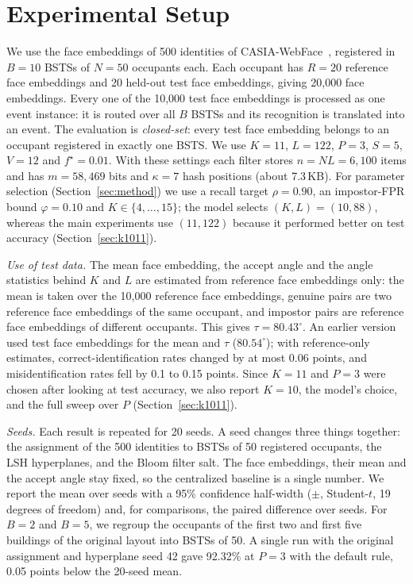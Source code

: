 \documentclass[pdflatex,sn-mathphys-num]{sn-jnl}%
\theoremstyle{thmstyleone}%
\theoremstyle{thmstyletwo}%
\theoremstyle{thmstylethree}%
\begin{document}
\section{Experimental Setup}
\label{sec:setup}

We use the face embeddings of 500 identities of CASIA-WebFace~\cite{yi2014}, registered in $B=10$ BSTSs of $N=50$ occupants each. Each occupant has $R=20$ reference face embeddings and 20 held-out test face embeddings, giving 20,000 face embeddings. Every one of the 10,000 test face embeddings is processed as one event instance: it is routed over all $B$ BSTSs and its recognition is translated into an event. The evaluation is \emph{closed-set}: every test face embedding belongs to an occupant registered in exactly one BSTS. We use $K=11$, $L=122$, $P=3$, $S=5$, $V=12$ and $f^{\star}=0.01$. With these settings each filter stores $n=NL=6{,}100$ items and has $m=58{,}469$ bits and $\kappa=7$ hash positions (about 7.3\,KB). For parameter selection (Section~\ref{sec:method}) we use a recall target $\rho=0.90$, an impostor-FPR bound $\varphi=0.10$ and $K\in\{4,\ldots,15\}$; the model selects $(K,L)=(10,88)$, whereas the main experiments use $(11,122)$ because it performed better on test accuracy (Section~\ref{sec:k1011}).

\emph{Use of test data.} The mean face embedding, the accept angle and the angle statistics behind $K$ and $L$ are estimated from reference face embeddings only: the mean is taken over the 10,000 reference face embeddings, genuine pairs are two reference face embeddings of the same occupant, and impostor pairs are reference face embeddings of different occupants. This gives $\tau=80.43^{\circ}$. An earlier version used test face embeddings for the mean and $\tau$ ($80.54^{\circ}$); with reference-only estimates, correct-identification rates changed by at most 0.06 points, and misidentification rates fell by 0.1 to 0.15 points. Since $K=11$ and $P=3$ were chosen after looking at test accuracy, we also report $K=10$, the model's choice, and the full sweep over $P$ (Section~\ref{sec:k1011}).

\emph{Seeds.} Each result is repeated for 20 seeds. A seed changes three things together: the assignment of the 500 identities to BSTSs of 50 registered occupants, the LSH hyperplanes, and the Bloom filter salt. The face embeddings, their mean and the accept angle stay fixed, so the centralized baseline is a single number. We report the mean over seeds with a 95\% confidence half-width ($\pm$, Student-$t$, 19 degrees of freedom) and, for comparisons, the paired difference over seeds. For $B=2$ and $B=5$, we regroup the occupants of the first two and first five buildings of the original layout into BSTSs of 50. A single run with the original assignment and hyperplane seed 42 gave 92.32\% at $P=3$ with the default rule, 0.05 points below the 20-seed mean.
\end{document}
